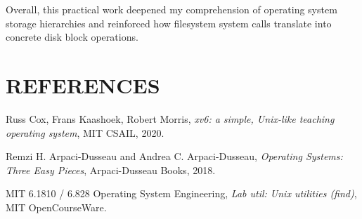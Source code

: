 \documentclass[12pt,a4paper]{report}
\numberwithin{equation}{chapter}
\numberwithin{figure}{chapter}
\numberwithin{table}{chapter}
\begin{document}
Overall, this practical work deepened my comprehension of operating system storage hierarchies and reinforced how filesystem system calls translate into concrete disk block operations.

\chapter*{REFERENCES}

\noindent [1] Russ Cox, Frans Kaashoek, Robert Morris, \textit{xv6: a simple, Unix-like teaching operating system}, MIT CSAIL, 2020.

\noindent [2] Remzi H. Arpaci-Dusseau and Andrea C. Arpaci-Dusseau, \textit{Operating Systems: Three Easy Pieces}, Arpaci-Dusseau Books, 2018.

\noindent [3] MIT 6.1810 / 6.828 Operating System Engineering, \textit{Lab util: Unix utilities (find)}, MIT OpenCourseWare.
\end{document}
